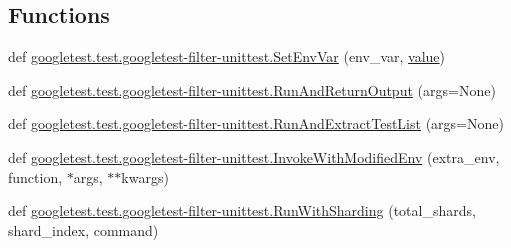 \subsection*{Functions}
\begin{DoxyCompactItemize}
\item 
def \mbox{\hyperlink{namespacegoogletest_1_1test_1_1googletest-filter-unittest_ab1f9b08e84805d31be99e2062bf33d12}{googletest.\+test.\+googletest-\/filter-\/unittest.\+Set\+Env\+Var}} (env\+\_\+var, \mbox{\hyperlink{_obj__test_2lib_2googletest-master_2googlemock_2test_2gmock-matchers__test_8cc_a337b8a670efc0b086ad3af163f3121b6}{value}})
\item 
def \mbox{\hyperlink{namespacegoogletest_1_1test_1_1googletest-filter-unittest_a9148123b84571c3f71e9bc696b4a5602}{googletest.\+test.\+googletest-\/filter-\/unittest.\+Run\+And\+Return\+Output}} (args=None)
\item 
def \mbox{\hyperlink{namespacegoogletest_1_1test_1_1googletest-filter-unittest_a2713cde4887dae3fbf7dea6609be9c3c}{googletest.\+test.\+googletest-\/filter-\/unittest.\+Run\+And\+Extract\+Test\+List}} (args=None)
\item 
def \mbox{\hyperlink{namespacegoogletest_1_1test_1_1googletest-filter-unittest_af029a8050c10c4ec9391cfca6c64c6c3}{googletest.\+test.\+googletest-\/filter-\/unittest.\+Invoke\+With\+Modified\+Env}} (extra\+\_\+env, function, $\ast$args, $\ast$$\ast$kwargs)
\item 
def \mbox{\hyperlink{namespacegoogletest_1_1test_1_1googletest-filter-unittest_a8a2811c773df0897f343b9a3f3af4619}{googletest.\+test.\+googletest-\/filter-\/unittest.\+Run\+With\+Sharding}} (total\+\_\+shards, shard\+\_\+index, command)
\end{DoxyCompactItemize}
